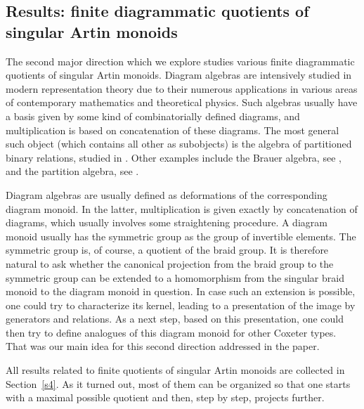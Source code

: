 \documentclass[a4paper]{amsart}
\begin{document}
\subsection{Results: finite diagrammatic quotients of singular Artin monoids}\label{s1.4}

The second major direction which we explore studies various finite 
diagrammatic quotients of singular Artin monoids. Diagram algebras
are intensively studied in modern representation theory due to their
numerous applications in various areas of contemporary mathematics
and theoretical physics. Such algebras usually have a basis given by
some kind of combinatorially defined diagrams, and multiplication is
based on concatenation of these diagrams. The most general such object
(which contains all other as subobjects) is the algebra of partitioned
binary relations, studied in \cite{MM13}. Other examples include the 
Brauer algebra, see \cite{Br}, and the partition algebra, see \cite{Mar94}. 

Diagram algebras are usually defined as deformations of the corresponding
diagram monoid. In the latter, multiplication is given exactly by
concatenation of diagrams, which usually involves some straightening
procedure. A diagram monoid usually has the symmetric group as the
group of invertible elements. The symmetric group is, of course,
a quotient of the braid group. It is therefore natural to ask
whether the canonical projection from the braid group to the symmetric
group can be extended to a homomorphism from the singular braid monoid
to the diagram monoid in question. In case such an extension is possible,
one could try to characterize its kernel, leading to a presentation of
the image by generators and relations. As a next step, based on this
presentation, one could then try to define analogues of this diagram
monoid for other Coxeter types. That was our main idea for this second
direction addressed in the paper.

All results related to finite quotients of singular Artin monoids
are collected in Section~\ref{s4}. As it turned out, most of them 
can be organized so that one starts with a maximal possible quotient
and then, step by step, projects further.
\end{document}
